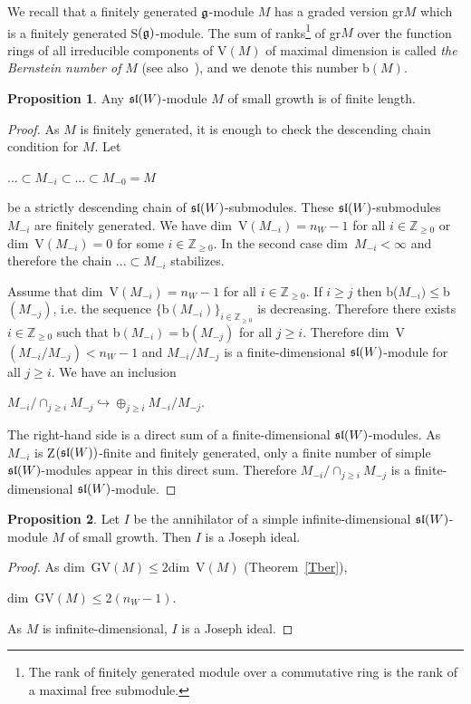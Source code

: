 \documentclass[12pt]{amsart}
\theoremstyle{definition}\newtheorem{theorem}{Theorem}[section]
\newtheorem{proposition}{Proposition}[section]
\theoremstyle{definition}\newtheorem{definition}[proposition]{Definition}
\theoremstyle{remark}\newtheorem{example}[proposition]{Example}
\begin{document}
We recall that a finitely generated $\frak g$-module $M$ has a graded version gr$M$ which is a finitely generated S$(\frak g)$-module. The sum of ranks\footnote{The rank of finitely generated module over a commutative ring is the rank of a maximal free submodule.} of gr$M$ over the function rings of all irreducible components of V$(M)$ of maximal dimension is called {\it the Bernstein number of} $M$ (see also~\cite[p.~78]{KL}), and we denote this number b$(M)$.
\begin{proposition}Any $\frak{sl}(W)$-module $M$ of small growth is of finite length.\end{proposition}
\begin{proof}As $M$ is finitely generated, it is enough to check the descending chain condition for $M$. Let \begin{center}$...\subset M_{-i}\subset...\subset M_{-0}=M$\end{center} be a strictly descending chain of $\frak{sl}(W)$-submodules. These $\frak{sl}(W)$-submodules $M_{-i}$ are finitely generated. We have dim~V$(M_{-i})=n_W-1$ for all $i\in\mathbb Z_{\ge0}$ or dim~V$(M_{-i})=0$ for some $i\in\mathbb Z_{\ge0}$. In the second case dim~$M_{-i}<\infty$ and therefore the chain $...\subset M_{-i}$ stabilizes.

Assume that dim~V$(M_{-i})=n_W-1$ for all $i\in\mathbb Z_{\ge0}$. If $i\ge j$ then b($M_{-i})\le$b$(M_{-j})$, i.e. the sequence $\{$b$(M_{-i})\}_{i\in\mathbb Z_{\ge0}}$ is decreasing. Therefore there exists $i\in\mathbb Z_{\ge0}$ such that b$(M_{-i})=$b$(M_{-j})$ for all $j\ge i$. Therefore dim~V$(M_{-i}/M_{-j})<n_W-1$ and $M_{-i}/M_{-j}$ is a finite-dimensional $\frak{sl}(W)$-module for all $j\ge i$. We have an inclusion\begin{center}$M_{-i}/\cap_{j\ge i}M_{-j}\hookrightarrow \oplus_{j\ge i}M_{-i}/M_{-j}$.\end{center}The right-hand side is a direct sum of a finite-dimensional $\frak{sl}(W)$-modules. As $M_{-i}$ is Z$(\frak{sl}(W))$-finite and finitely generated, only a finite number of simple $\frak{sl}(W)$-modules appear in this direct sum. Therefore $M_{-i}/\cap_{j\ge i}M_{-j}$ is a finite-dimensional $\frak{sl}(W)$-module.\end{proof}
\begin{proposition}\label{Pasm} Let $I$ be the annihilator of a simple infinite-dimensional $\frak{sl}(W)$-module $M$ of small growth. Then $I$ is a Joseph ideal.\end{proposition}
\begin{proof} As dim~GV$(M)\le2$dim~V$(M)$ (Theorem~\ref{Tber}),\begin{center} dim~GV$(M)\le$2$(n_W-1)$.\end{center} As $M$ is infinite-dimensional, $I$ is a Joseph ideal.\end{proof}
\end{document}
